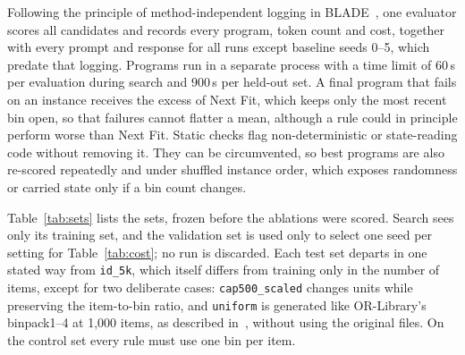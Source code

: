 \documentclass[10pt,twocolumn]{article}
\makeatletter
\renewcommand\subsection{\@startsection{subsection}{2}{\z@}{2.2ex \@plus .5ex \@minus .2ex}{1ex \@plus .2ex}{\normalfont\large\bfseries}}
\makeatother
\begin{document}
Following the principle of method-independent logging in BLADE~\citep{vanstein2025blade}, one evaluator scores all candidates and records every program, token count and cost, together with every prompt and response for all runs except baseline seeds 0--5, which predate that logging. Programs run in a separate process with a time limit of 60\,s per evaluation during search and 900\,s per held-out set. A final program that fails on an instance receives the excess of Next Fit, which keeps only the most recent bin open, so that failures cannot flatter a mean, although a rule could in principle perform worse than Next Fit. Static checks flag non-deterministic or state-reading code without removing it. They can be circumvented, so best programs are also re-scored repeatedly and under shuffled instance order, which exposes randomness or carried state only if a bin count changes.

\subsection{Instance sets}
Table~\ref{tab:sets} lists the sets, frozen before the ablations were scored. Search sees only its training set, and the validation set is used only to select one seed per setting for Table~\ref{tab:cost}; no run is discarded. Each test set departs in one stated way from \texttt{id\_5k}, which itself differs from training only in the number of items, except for two deliberate cases: \texttt{cap500\_scaled} changes units while preserving the item-to-bin ratio, and \texttt{uniform} is generated like OR-Library's binpack1--4 at 1,000 items, as described in~\citep{romera2024funsearch}, without using the original files. On the control set every rule must use one bin per item.
\end{document}
